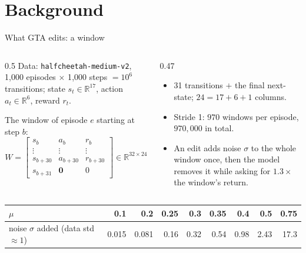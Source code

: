 \documentclass[aspectratio=169,11pt]{beamer}
\newcommand{\R}{\mathbb{R}}
\begin{document}
\section{Background}
\begin{frame}{What GTA edits: a window}
\begin{columns}[T]
\begin{column}{0.5\linewidth}
Data: \texttt{halfcheetah-medium-v2}, 1{,}000 episodes $\times$ 1{,}000 steps $=10^6$ transitions; state $s_t\in\R^{17}$, action $a_t\in\R^6$, reward $r_t$.
\vspace{0.5em}

The window of episode $e$ starting at step $b$:
\[
W=\begin{bmatrix}
s_b & a_b & r_b\\
\vdots & \vdots & \vdots\\
s_{b+30} & a_{b+30} & r_{b+30}\\
s_{b+31} & \bm 0 & 0
\end{bmatrix}\in\R^{32\times24}
\]
\end{column}
\begin{column}{0.47\linewidth}
\begin{itemize}
\item 31 transitions $+$ the final next-state; $24=17+6+1$ columns.
\item Stride 1: $970$ windows per episode, $970{,}000$ in total.
\item An edit adds noise $\sigma$ to the whole window once, then the model removes it while asking for $1.3\times$ the window's return.
\end{itemize}
\end{column}
\end{columns}
\vspace{0.5em}
\centering\small
\begin{tabular}{lrrrrrrrr}
\toprule
$\mu$ & 0.1 & 0.2 & 0.25 & 0.3 & 0.35 & 0.4 & 0.5 & 0.75\\
\midrule
noise $\sigma$ added (data std $\approx1$) & 0.015 & 0.081 & 0.16 & 0.32 & 0.54 & 0.98 & 2.43 & 17.3\\
\bottomrule
\end{tabular}
\end{frame}
\end{document}
